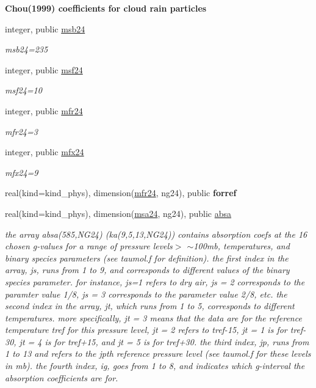 \begin{Indent}\textbf{ Chou(1999) coefficients for cloud rain particles}\par
\begin{DoxyCompactItemize}
\item 
integer, public \hyperlink{group__module__radsw__kgbnn_ga0ec09b4df9fbfa868844ad93a84cbe31}{msb24}
\begin{DoxyCompactList}\small\item\em msb24=235 \end{DoxyCompactList}\item 
integer, public \hyperlink{group__module__radsw__kgbnn_ga52d0fde0af1d5427acf0d1924f393cdc}{msf24}
\begin{DoxyCompactList}\small\item\em msf24=10 \end{DoxyCompactList}\item 
integer, public \hyperlink{group__module__radsw__kgbnn_ga3a1c3808493ce89f2218116a02350e51}{mfr24}
\begin{DoxyCompactList}\small\item\em mfr24=3 \end{DoxyCompactList}\item 
integer, public \hyperlink{group__module__radsw__kgbnn_ga6fcafb0e1605ad49a252ed1e22b00a5b}{mfx24}
\begin{DoxyCompactList}\small\item\em mfx24=9 \end{DoxyCompactList}\item 
real(kind=kind\+\_\+phys), dimension(\hyperlink{group__module__radsw__kgbnn_ga3a1c3808493ce89f2218116a02350e51}{mfr24}, ng24), public {\bfseries forref}
\item 
real(kind=kind\+\_\+phys), dimension(\hyperlink{namespacemodule__radsw__kgb24_ad416df05aed8a6ae1ecd57d5c90c223c}{msa24}, ng24), public \hyperlink{group__module__radsw__kgbnn_ga06965ec156c4e1d18d50a70ba43bd8e1}{absa}
\begin{DoxyCompactList}\small\item\em the array absa(585,\+N\+G24) (ka(9,5,13,\+N\+G24)) contains absorption coefs at the 16 chosen g-\/values for a range of pressure levels$>$ $\sim$100mb, temperatures, and binary species parameters (see taumol.\+f for definition). the first index in the array, js, runs from 1 to 9, and corresponds to different values of the binary species parameter. for instance, js=1 refers to dry air, js = 2 corresponds to the paramter value 1/8, js = 3 corresponds to the parameter value 2/8, etc. the second index in the array, jt, which runs from 1 to 5, corresponds to different temperatures. more specifically, jt = 3 means that the data are for the reference temperature tref for this pressure level, jt = 2 refers to tref-\/15, jt = 1 is for tref-\/30, jt = 4 is for tref+15, and jt = 5 is for tref+30. the third index, jp, runs from 1 to 13 and refers to the jpth reference pressure level (see taumol.\+f for these levels in mb). the fourth index, ig, goes from 1 to 8, and indicates which g-\/interval the absorption coefficients are for. \end{DoxyCompactList}\item 

\end{DoxyCompactItemize}
\end{Indent}
